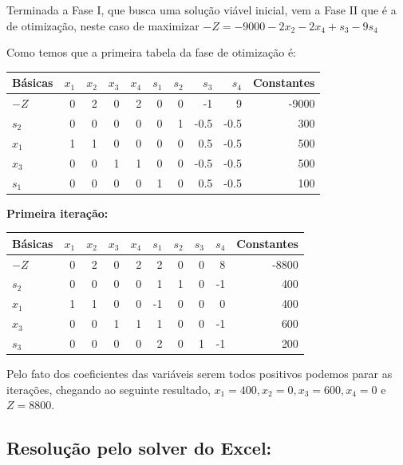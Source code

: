 \documentclass[12pt, a4paper]{article}
\begin{document}
Terminada a Fase I, que busca uma solução viável inicial, vem a Fase II que é a de otimização, neste caso  de maximizar $-Z = -9000 - 2x_2 - 2x_4 + s_3 - 9s_4$

Como temos que a primeira tabela da fase de otimização é:

\begin{center}
\begin{tabular}{lrrrrrrrrr}
\toprule
Básicas & $x_1$ & $x_2$ & $x_3$ & $x_4$ & $s_1$ & $s_2$ & $s_3$ & $s_4$ & Constantes \\
\midrule
$-Z$ & 0 & 2 & 0 & 2 & 0 & 0 & -1 & 9 & -9000 \\
$s_2$ & 0 & 0 & 0 & 0 & 0 & 1 & -0.5 & -0.5 & 300 \\
$x_1$ & 1 & 1 & 0 & 0 & 0 & 0 & 0.5 & -0.5 & 500 \\
$x_3$ & 0 & 0 & 1 & 1 & 0 & 0 & -0.5 & -0.5 & 500 \\
$s_1$ & 0 & 0 & 0 & 0 & 1 & 0 & 0.5 & -0.5 & 100 \\
\bottomrule
\end{tabular}  
\end{center}

\textbf{Primeira iteração:}

\begin{center}
\begin{tabular}{lrrrrrrrrr}
\toprule
Básicas & $x_1$ & $x_2$ & $x_3$ & $x_4$ & $s_1$ & $s_2$ & $s_3$ & $s_4$ & Constantes \\
\midrule
$-Z$ & 0 & 2 & 0 & 2 & 2 & 0 & 0 & 8 & -8800 \\
$s_2$ & 0 & 0 & 0 & 0 & 1 & 1 & 0 & -1 & 400 \\
$x_1$ & 1 & 1 & 0 & 0 & -1 & 0 & 0 & 0 & 400 \\
$x_3$ & 0 & 0 & 1 & 1 & 1 & 0 & 0 & -1 & 600 \\
$s_3$ & 0 & 0 & 0 & 0 & 2 & 0 & 1 & -1 & 200 \\
\bottomrule
\end{tabular}
\end{center}

Pelo fato dos coeficientes das variáveis serem todos positivos podemos parar as iterações, chegando ao seguinte resultado, $x_1 = 400, x_2 = 0, x_3 = 600, x_4 = 0$ e $Z = 8800$.

\cleardoublepage
\subsection[Solver]{Resolução pelo solver do Excel:}
\end{document}
